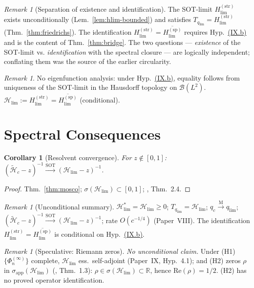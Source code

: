\documentclass[12pt,a4paper]{amsart}
\newtheorem{corollary}[theorem]{Corollary}
\theoremstyle{definition}
\theoremstyle{remark}
\newtheorem{remark}[theorem]{Remark}
\newcommand{\Hc}{\widetilde{\mathcal{H}}_c}
\newcommand{\Hlim}{\mathcal{H}_{\lim}}
\newcommand{\Hstrong}{H_{\lim}^{(\mathrm{str})}}
\newcommand{\Hspectral}{H_{\lim}^{(\mathrm{sp})}}
\newcommand{\qc}{q_c}
\newcommand{\qlim}{q_{\lim}}
\begin{document}
\begin{remark}[Separation of existence
  and identification]
\label{rem:bridge-sep}
The SOT-limit $\Hstrong$ exists
unconditionally
(Lem.~\ref{lem:hlim-bounded})
and satisfies $T_{\qlim}=\Hstrong$
(Thm.~\ref{thm:friedrichs}).
The identification
$\Hstrong=\overline{\Hspectral}$
requires Hyp.~\hyperref[IXb]{(IX.b)}
and is the content of
Thm.~\ref{thm:bridge}.
The two questions ---
\emph{existence} of the SOT-limit vs.
\emph{identification} with the
spectral closure --- are logically
independent; conflating them was
the source of the earlier circularity.
\end{remark}

\begin{remark}
No eigenfunction analysis:
under Hyp.~\hyperref[IXb]{(IX.b)},
equality follows from uniqueness of
the SOT-limit in the Hausdorff
topology on $\mathcal{B}(L^2)$.
$\Hlim:=\Hstrong=\overline{\Hspectral}$
(conditional).
\end{remark}

\section{Spectral Consequences}
\label{sec:consequences}

\begin{corollary}[Resolvent convergence]
\label{cor:resolvent}
For $z\notin[0,1]$:
$(\Hc-z)^{-1}
\xrightarrow{\mathrm{SOT}}
(\Hlim-z)^{-1}$.
\end{corollary}
\begin{proof}
Thm.~\ref{thm:mosco};
$\sigma(\Hlim)\subset[0,1]$;
\cite{KuwaeShioya2003}, Thm.~2.4.
\end{proof}

\begin{remark}[Unconditional summary]
$\Hlim^*=\Hlim\ge 0$;
$T_{\qlim}=\Hlim$;
$\qc\xrightarrow{\mathrm{M}}\qlim$;
$(\Hc-z)^{-1}\xrightarrow{\mathrm{SOT}}
(\Hlim-z)^{-1}$;
rate $O(c^{-1/4})$ (Paper~VIII).
The identification
$\Hstrong=\overline{\Hspectral}$
is conditional on
Hyp.~\hyperref[IXb]{(IX.b)}.
\end{remark}

\begin{remark}[Speculative:
  Riemann zeros]
\label{rem:rh}
\emph{No unconditional claim.}
Under (H1) $\{\Phi_n^{(\infty)}\}$
complete, $\Hlim$ ess.\ self-adjoint
(Paper~IX, Hyp.~4.1);
and (H2) zeros $\rho$ in
$\sigma_{\mathrm{app}}(\Hlim)$
(\cite{CCM2025}, Thm.~1.3):
$\rho\in\sigma(\Hlim)\subset\mathbb{R}$,
hence $\mathrm{Re}(\rho)=1/2$.
(H2) has no proved operator
identification.
\end{remark}
\end{document}
